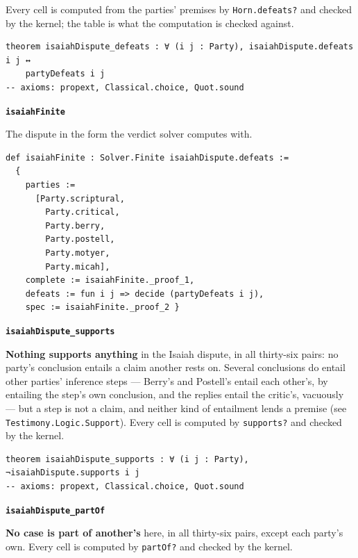 \documentclass[11pt]{article}
\begin{document}
Every cell is computed from the parties' premises by \texttt{Horn.defeats?} and checked by the kernel; the table is what the computation is checked against.

{\small\begin{verbatim}
theorem isaiahDispute_defeats : ∀ (i j : Party), isaiahDispute.defeats i j ↔
    partyDefeats i j
-- axioms: propext, Classical.choice, Quot.sound
\end{verbatim}}
\par\medskip\noindent\textbf{\texttt{isaiah\allowbreak{}Finite}}\par\nobreak\noindent
The dispute in the form the verdict solver computes with.

{\small\begin{verbatim}
def isaiahFinite : Solver.Finite isaiahDispute.defeats :=
  {
    parties :=
      [Party.scriptural,
        Party.critical,
        Party.berry,
        Party.postell,
        Party.motyer,
        Party.micah],
    complete := isaiahFinite._proof_1,
    defeats := fun i j => decide (partyDefeats i j),
    spec := isaiahFinite._proof_2 }
\end{verbatim}}
\par\medskip\noindent\textbf{\texttt{isaiah\allowbreak{}Dispute\_\allowbreak{}supports}}\par\nobreak\noindent
\textbf{Nothing supports anything} in the Isaiah dispute, in all thirty-six pairs: no party's conclusion entails a claim another rests on. Several conclusions do entail other parties' inference steps — Berry's and Postell's entail each other's, by entailing the step's own conclusion, and the replies entail the critic's, vacuously — but a step is not a claim, and neither kind of entailment lends a premise (see \texttt{Testimony.Logic.Support}). Every cell is computed by \texttt{supports?} and checked by the kernel.

{\small\begin{verbatim}
theorem isaiahDispute_supports : ∀ (i j : Party), ¬isaiahDispute.supports i j
-- axioms: propext, Classical.choice, Quot.sound
\end{verbatim}}
\par\medskip\noindent\textbf{\texttt{isaiah\allowbreak{}Dispute\_\allowbreak{}part\allowbreak{}Of}}\par\nobreak\noindent
\textbf{No case is part of another's} here, in all thirty-six pairs, except each party's own. Every cell is computed by \texttt{part\allowbreak{}Of?} and checked by the kernel.
\end{document}

